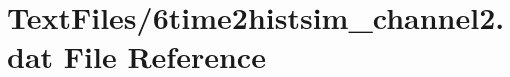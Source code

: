 \hypertarget{6time2histsim__channel2_8dat}{}\section{Text\+Files/6time2histsim\+\_\+channel2.dat File Reference}
\label{6time2histsim__channel2_8dat}
